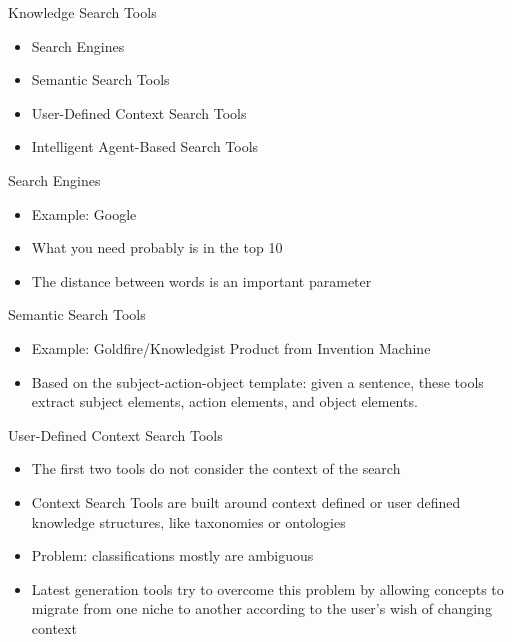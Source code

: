 \documentclass{beamer}
\begin{document}
	\begin{frame}{Knowledge Search Tools}
		\begin{itemize}
			\item Search Engines
			\item Semantic Search Tools
			\item User-Defined Context Search Tools
			\item Intelligent Agent-Based Search Tools
		\end{itemize}
	\end{frame}

	\begin{frame}{Search Engines}
		\begin{itemize}
		    \item Example: Google
			\item What you need probably is in the top 10%
			\item The distance between words is an important parameter
		\end{itemize}
	\end{frame}



	\begin{frame}{Semantic Search Tools}
		\begin{itemize}
			\item Example: Goldfire/Knowledgist Product from Invention Machine
			\item Based on the subject-action-object template: given a sentence, these tools extract subject elements, action elements, and object elements.
		\end{itemize}
	\end{frame}
	
	\begin{frame}{User-Defined Context Search Tools}
	    \begin{itemize}
	        \item The first two tools do not consider the context of the search
	        \item Context Search Tools are built around context defined or user defined knowledge structures, like taxonomies or ontologies
	        \item Problem: classifications mostly are ambiguous
	        \item Latest generation tools try to overcome this problem by allowing concepts to migrate from one niche to another according to the user's wish of changing context
	    \end{itemize}
	\end{frame}
\end{document}
